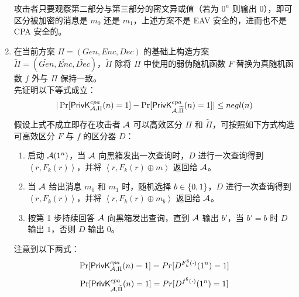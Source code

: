 \begin{questions}
\begin{solution}
\begin{enumerate}
                攻击者只要观察第二部分与第三部分的密文异或值（若为 $0^n$ 则输出 $0$），即可区分被加密的消息是 $m_0$ 还是 $m_1$，上述方案不是 EAV 安全的，进而也不是 CPA 安全的。
                \item 在当前方案 $\Pi=(Gen,Enc,Dec)$ 的基础上构造方案 $\widetilde{\Pi}=(\widetilde{Gen},\widetilde{Enc},\widetilde{Dec})$，$\widetilde{\Pi}$ 除将 $\Pi$ 中使用的弱伪随机函数 $F$ 替换为真随机函数 $f$ 外与 $\Pi$ 保持一致。\\
                先证明以下等式成立：
                \begin{equation}
                    \label{equal-5}
                    \begin{aligned}
                        |\Pr[\mathsf{PrivK}^{cpa}_{\mathcal{A},\Pi}(n)=1]-\Pr[\mathsf{PrivK}^{cpa}_{\mathcal{A},\widetilde{\Pi}}(n)=1]|\leq{negl}(n)
                    \end{aligned}
                \end{equation}
                假设上式不成立即存在攻击者 $\mathcal{A}$ 可以高效区分 $\Pi$ 和 $\widetilde{\Pi}$，可按照如下方式构造可高效区分 $F$ 与 $f$ 的区分器 $D$：
                \begin{enumerate}
                    \item 启动 $\mathcal{A}(1^n)$，当 $\mathcal{A}$ 向黑箱发出一次查询时，$D$ 进行一次查询得到 $\left\langle{r,F_k(r)}\right\rangle$，并将 $\left\langle{r,F_k(r)\oplus{m}}\right\rangle$ 返回给 $\mathcal{A}$。
                    \item 当 $\mathcal{A}$ 给出消息 $m_0$ 和 $m_1$ 时，随机选择 $b\in\{{0,1}\}$，$D$ 进行一次查询得到 $\left\langle{r,F_k(r)}\right\rangle$，并将 $\left\langle{r,F_k(r)\oplus{m_b}}\right\rangle$ 返回给 $\mathcal{A}$。
                    \item 按第 1 步持续回答 $\mathcal{A}$ 向黑箱发出查询，直到 $\mathcal{A}$ 输出 $b'$，当 $b'=b$ 时 $D$ 输出 $1$，否则 $D$ 输出 $0$。
                \end{enumerate}
                注意到以下两式：
                \begin{equation}
                    \begin{aligned}
                       \Pr[\mathsf{PrivK}^{cpa}_{\mathcal{A},\Pi}(n)=1]=Pr[D^{F_k^{\$}(\cdot)}(1^n)=1]
                    \end{aligned}
                \end{equation}
                \begin{equation}
                    \begin{aligned}
                       \Pr[\algo{PrivK}^{cpa}_{\AdvA,\widetilde{\Pi}}(n)=1]=Pr[D^{f^{\$}(\cdot)}(1^n)=1]

\end{aligned}
\end{equation}
\end{enumerate}
\end{solution}
\end{questions}
